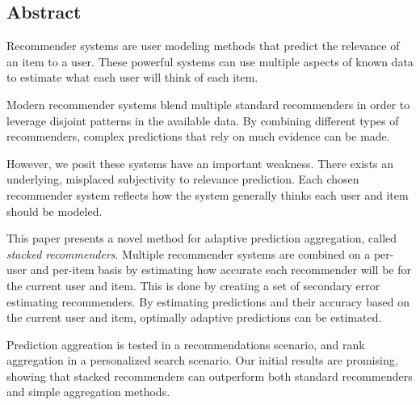 \begin{narrow}

\chapter*{Abstract}

Recommender systems are user modeling methods
that predict the relevance of an item to a user.
These powerful systems can use multiple aspects of known data
to estimate what each user will think of each item.

Modern recommender systems blend multiple standard recommenders
in order to leverage disjoint patterns in the available data.
By combining different types of recommenders,
complex predictions that rely on much evidence can be made.

However, we posit these systems have an important weakness.
There exists an underlying, misplaced subjectivity to relevance prediction.
Each chosen recommender system reflects how the system
generally thinks each user and item should be modeled.

This paper presents a novel method for adaptive prediction aggregation,
called \emph{stacked recommenders}.
Multiple recommender systems are combined on a per-user and per-item basis
by estimating how accurate each recommender will be for the current user and item.
This is done by creating a set of secondary error estimating recommenders.
By estimating predictions and their accuracy based 
on the current user and item,
optimally adaptive predictions can be estimated.

Prediction aggreation is tested in a recommendations scenario,
and rank aggregation in a personalized search scenario.
Our initial results are promising, showing that stacked recommenders
can outperform both standard recommenders and simple aggregation methods.

\end{narrow}

\vfill
